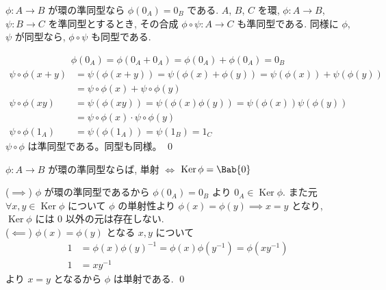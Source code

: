 \documentclass[uplatex,dvipdfmx,a4paper,11pt]{jlreq}
\makeatletter
\DeclareMathOperator{\Kernel}{Ker}
\theoremstyle{definition}
\renewenvironment{proof}[1][\proofname]{\par
  \normalfont
  \topsep6\p@\@plus6\p@ \trivlist
  \item[\hskip\labelsep{\bfseries #1}\@addpunct{\bfseries}]\ignorespaces\quad\par
}{%
  \qed\endtrivlist\@endpefalse
}
\renewcommand\proofname{証明}
\makeatother
\begin{document}
\begin{proposition}
  $\phi:A\to B$ が環の準同型なら $\phi(0_A) = 0_B$ である.
  $A$, $B$, $C$ を環, $\phi:A\to B$, $\psi:B\to C$ を準同型とするとき, その合成 $\phi\circ\psi:A\to C$ も準同型である. 同様に $\phi$, $\psi$ が同型なら, $\phi\circ\psi$ も同型である.
\end{proposition}
\begin{proof}
  \begin{align}
    \phi(0_A) = \phi(0_A + 0_A) = \phi(0_A) + \phi(0_A) = 0_B
  \end{align}
  \begin{align}
    \psi\circ\phi(x + y) & = \psi(\phi(x + y)) = \psi(\phi(x) + \phi(y)) = \psi(\phi(x)) + \psi(\phi(y)) \\
                         & = \psi\circ\phi(x) + \psi\circ\phi(y)                                         \\
    \psi\circ\phi(xy)    & = \psi(\phi(xy)) = \psi(\phi(x)\phi(y)) = \psi(\phi(x))\psi(\phi(y))          \\
                         & = \psi\circ\phi(x)\cdot\psi\circ\phi(y)                                       \\
    \psi\circ\phi(1_A)   & = \psi(\phi(1_A)) = \psi(1_B) = 1_C
  \end{align}
  $\psi\circ\phi$ は準同型である。同型も同様。
\end{proof}

\begin{proposition}
  $\phi:A\to B$ が環の準同型ならば, 単射 $\iff$ $\Kernel{\phi} = \Bab{0}$
\end{proposition}
\begin{proof}
  ($\implies$) $\phi$ が環の準同型であるから $\phi(0_A) = 0_B$ より $0_A\in\Kernel\phi$. また元 $\forall x, y \in \Kernel\phi$ について $\phi$ の単射性より $\phi(x) = \phi(y) \implies x = y$ となり, $\Kernel\phi$ には $0$ 以外の元は存在しない. \\
  ($\impliedby$) $\phi(x) = \phi(y)$ となる $x, y$ について
  \begin{align}
    1 & = \phi(x)\phi(y)^{-1} = \phi(x)\phi(y^{-1}) = \phi(xy^{-1}) \\
    1 & = xy^{-1}
  \end{align}
  より $x = y$ となるから $\phi$ は単射である.
\end{proof}
\end{document}
